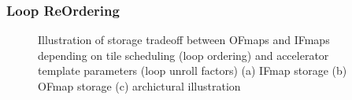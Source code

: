 \clearpage 

\subsubsection{Loop ReOrdering}
\label{chap:dataflow_dse:pruning:applying_it:loop_ordering}


\begin{figure}
    \centering
    \hspace{0.1cm} 
    \caption{Illustration of storage tradeoff between OFmaps and IFmaps depending on tile scheduling (loop ordering) and accelerator template parameters (loop unroll factors) (a) IFmap storage (b) OFmap storage (c) archictural illustration}
    \label{fig:Fmap_scaling}
\end{figure}

